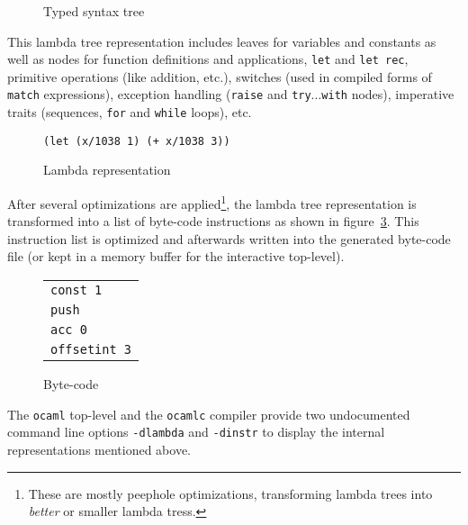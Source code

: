 \documentclass[10pt,a4paper,twocolumn]{article}
\begin{document}
\begin{figure}[ht]
  \centering
  \caption{Typed syntax tree}
  \label{figure:Typed_syntax_tree}
\end{figure}

This lambda tree representation includes leaves for variables and constants as well as nodes for function
definitions and applications, \texttt{let} and \texttt{let rec}, primitive operations (like addition, etc.),
switches (used in compiled forms of \texttt{match} expressions), exception handling (\texttt{raise}
and \texttt{try$\ldots$with} nodes), imperative traits (sequences, \texttt{for} and \texttt{while}
loops), etc.

\begin{figure}[ht]
  \centering
  \texttt{(let (x/1038 1) (+ x/1038 3))}
  \caption{Lambda representation}
  \label{figure:Lambda_representation}
\end{figure}

After several optimizations are applied\footnote{These are mostly peephole optimizations, transforming
  lambda trees into {\em better} or smaller lambda tress.}, the lambda tree representation is
transformed into a list of byte-code instructions as shown in figure~\ref{figure:Byte_code}.
This instruction list is optimized and afterwards written into the generated byte-code file
(or kept in a memory buffer for the interactive top-level).

\begin{figure}[ht]
  \centering
  \begin{tabular}{l}
    \texttt{const 1} \\
    \texttt{push} \\
    \texttt{acc 0} \\
    \texttt{offsetint 3}
  \end{tabular}
  \caption{Byte-code}
  \label{figure:Byte_code}
\end{figure}

The \texttt{ocaml} top-level and the \texttt{ocamlc} compiler provide two undocumented command
line options \texttt{-dlambda} and \texttt{-dinstr} to display the internal representations
mentioned above.
\end{document}
